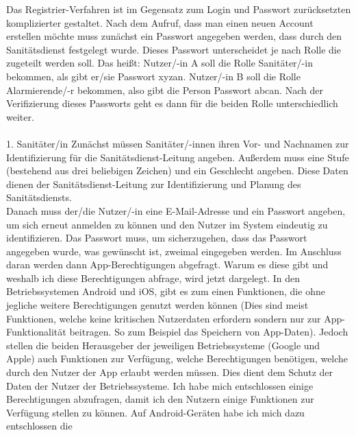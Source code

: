         Das Registrier-Verfahren ist im Gegensatz zum Login und Passwort
        zurücksetzten komplizierter gestaltet. Nach dem Aufruf, dass man einen neuen
        Account erstellen möchte muss zunächst ein Passwort angegeben werden, dass
        durch den Sanitätsdienst festgelegt wurde. Dieses Passwort unterscheidet 
        je nach Rolle die zugeteilt werden soll. Das heißt: Nutzer/-in A soll die 
        Rolle Sanitäter/-in bekommen, als gibt er/sie Passwort \glqq xyz\grqq an.
        Nutzer/-in B soll die Rolle Alarmierende/-r bekommen, also gibt die Person 
        Passwort \glqq abc\grqq an.
        \newline
        Nach der Verifizierung dieses Passworts geht es dann für die beiden
        Rolle unterschiedlich weiter. 
        \\\\
        1. Sanitäter/in
        \newline Zunächst müssen Sanitäter/-innen ihren Vor- und Nachnamen zur 
        Identifizierung für die Sanitätsdienst-Leitung angeben. Außerdem muss eine 
        Stufe (bestehend aus drei beliebigen Zeichen) und ein Geschlecht angeben. 
        Diese Daten dienen der Sanitätsdienst-Leitung zur Identifizierung und Planung
        des Sanitätsdiensts.\\ Danach muss der/die Nutzer/-in eine E-Mail-Adresse und
        ein Passwort angeben, um sich erneut anmelden zu können und den Nutzer im 
        System eindeutig zu identifizieren. Das Passwort muss, um sicherzugehen, dass
        das Passwort angegeben wurde, was gewünscht ist, zweimal eingegeben werden.
        Im Anschluss daran werden dann App-Berechtigungen abgefragt. Warum es diese
        gibt und weshalb ich diese Berechtigungen abfrage, wird jetzt dargelegt.
        In den Betriebssystemen Android und iOS, gibt es zum einen Funktionen, die 
        ohne jegliche weitere Berechtigungen genutzt werden können (Dies 
        sind meist Funktionen, welche keine kritischen Nutzerdaten erfordern sondern
        nur zur App-Funktionalität beitragen. So zum Beispiel das Speichern von
        App-Daten). Jedoch stellen die beiden Herausgeber der jeweiligen Betriebssysteme 
        (Google und Apple) auch Funktionen zur Verfügung, welche Berechtigungen benötigen, 
        welche durch den Nutzer der App erlaubt werden müssen. Dies dient dem Schutz der 
        Daten der Nutzer der Betriebssysteme. Ich habe mich entschlossen einige 
        Berechtigungen abzufragen, damit ich den Nutzern einige Funktionen zur Verfügung 
        stellen zu können. Auf Android-Geräten habe ich mich dazu entschlossen die 
